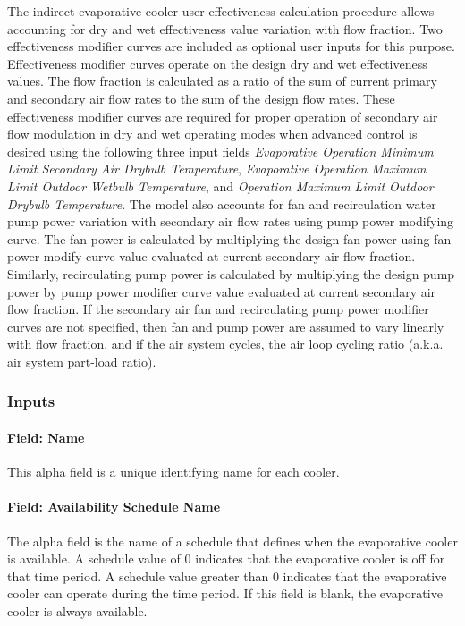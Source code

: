 The indirect evaporative cooler user effectiveness calculation procedure allows accounting for dry and wet effectiveness value variation with flow fraction. Two effectiveness modifier curves are included as optional user inputs for this purpose. Effectiveness modifier curves operate on the design dry and wet effectiveness values. The flow fraction is calculated as a ratio of the sum of current primary and secondary air flow rates to the sum of the design flow rates. These effectiveness modifier curves are required for proper operation of secondary air flow modulation in dry and wet operating modes when advanced control is desired using the following three input fields \textit{Evaporative Operation Minimum Limit Secondary Air Drybulb Temperature}, \textit{Evaporative Operation Maximum Limit Outdoor Wetbulb Temperature}, and \textit{Operation Maximum Limit Outdoor Drybulb Temperature}. The model also accounts for fan and recirculation water pump power variation with secondary air flow rates using pump power modifying curve. The fan power is calculated by multiplying the design fan power using fan power modify curve value evaluated at current secondary air flow fraction. Similarly, recirculating pump power is calculated by multiplying the design pump power by pump power modifier curve value evaluated at current secondary air flow fraction. If the secondary air fan and recirculating pump power modifier curves are not specified, then fan and pump power are assumed to vary linearly with flow fraction, and if the air system cycles, the air loop cycling ratio (a.k.a. air system part-load ratio).

\subsubsection{Inputs}\label{inputs-4-011}

\paragraph{Field: Name}\label{field-name-4-010}

This alpha field is a unique identifying name for each cooler.

\paragraph{Field: Availability Schedule Name}\label{field-availability-schedule-name-1-004}

The alpha field is the name of a schedule that defines when the evaporative cooler is available. A schedule value of 0 indicates that the evaporative cooler is off for that time period. A schedule value greater than 0 indicates that the evaporative cooler can operate during the time period. If this field is blank, the evaporative cooler is always available.

